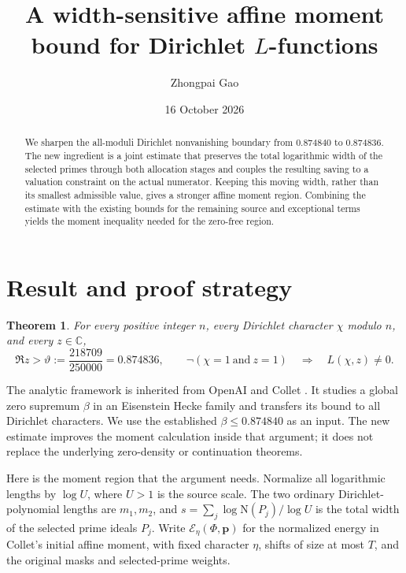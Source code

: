\documentclass[10pt,a4paper]{article}
\title{A width-sensitive affine moment bound for Dirichlet \texorpdfstring{$L$}{L}-functions}
\author{Zhongpai Gao}
\date{16 October 2026}
\newcommand{\tht}{\vartheta}
\newtheorem{theorem}{Theorem}
\begin{document}
\maketitle
\vspace{-2em}
\begin{abstract}
We sharpen the all-moduli Dirichlet nonvanishing boundary from $0.874840$
to $0.874836$. The new ingredient is a joint estimate that preserves the
total logarithmic width of the selected primes through both allocation
stages and couples the resulting saving to a valuation constraint on the
actual numerator. Keeping this moving width, rather than its smallest
admissible value, gives a stronger affine moment region. Combining the
estimate with the existing bounds for the remaining source and exceptional
terms yields the moment inequality needed for the zero-free region.
\end{abstract}

\section{Result and proof strategy}
\begin{theorem}
For every positive integer $n$, every Dirichlet character $\chi$ modulo $n$,
and every $z\in\mathbb C$,
\[
 \Re z>\tht:=\frac{218709}{250000}=0.874836,
 \qquad \neg(\chi=1\ \text{and}\ z=1)
 \quad\Longrightarrow\quad L(\chi,z)\ne0.                 \tag{1}
\]
\end{theorem}
The analytic framework is inherited from OpenAI and Collet
\cite{openai,collet}. It studies a global zero supremum $\beta$ in an
Eisenstein Hecke family and transfers its bound to all Dirichlet characters.
We use the established $\beta\le0.874840$ \cite{incumbent} as an input.
The new estimate improves the moment calculation inside that argument;
it does not replace the underlying zero-density or continuation theorems.

Here is the moment region that the argument needs. Normalize all logarithmic
lengths by $\log U$, where $U>1$ is the source scale. The two ordinary
Dirichlet-polynomial lengths are $m_1,m_2$, and
$s=\sum_j\log \mathrm N(P_j)/\log U$ is the total width of the selected prime ideals $P_j$.
Write $\mathcal E_\eta(\Phi,\mathbf p)$ for the normalized energy in Collet's initial affine
moment, with fixed character $\eta$, shifts of size at most $T$, and the
original masks and selected-prime weights.
\end{document}

